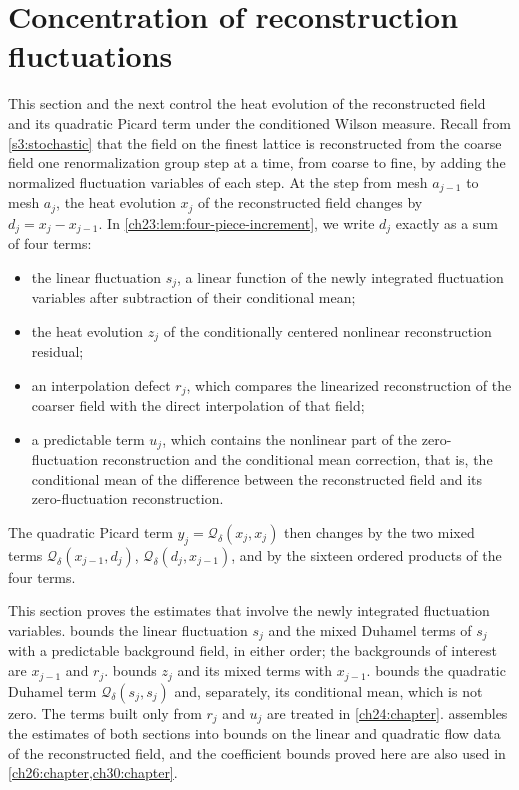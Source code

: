 \chapter{Concentration of reconstruction fluctuations}\label{ch23:chapter}

This section and the next control the heat evolution of the reconstructed field and its quadratic Picard term under the conditioned Wilson measure. Recall from \cref{s3:stochastic} that the field on the finest lattice is reconstructed from the coarse field one renormalization group step at a time, from coarse to fine, by adding the normalized fluctuation variables of each step. At the step from mesh $a_{j-1}$ to mesh $a_j$, the heat evolution $x_j$ of the reconstructed field changes by $d_j=x_j-x_{j-1}$. In \cref{ch23:lem:four-piece-increment}, we write $d_j$ exactly as a sum of four terms:
\begin{itemize}
\item the linear fluctuation $s_j$, a linear function of the newly integrated fluctuation variables after subtraction of their conditional mean;
\item the heat evolution $z_j$ of the conditionally centered nonlinear reconstruction residual;
\item an interpolation defect $r_j$, which compares the linearized reconstruction of the coarser field with the direct interpolation of that field;
\item a predictable term $u_j$, which contains the nonlinear part of the zero-fluctuation reconstruction and the conditional mean correction, that is, the conditional mean of the difference between the reconstructed field and its zero-fluctuation reconstruction.
\end{itemize}
The quadratic Picard term $y_j=\mathcal Q_\delta(x_j,x_j)$ then changes by the two mixed terms $\mathcal Q_\delta(x_{j-1},d_j)$, $\mathcal Q_\delta(d_j,x_{j-1})$, and by the sixteen ordered products of the four terms.

This section proves the estimates that involve the newly integrated fluctuation variables.  bounds the linear fluctuation $s_j$ and the mixed Duhamel terms of $s_j$ with a predictable background field, in either order; the backgrounds of interest are $x_{j-1}$ and $r_j$.  bounds $z_j$ and its mixed terms with $x_{j-1}$.  bounds the quadratic Duhamel term $\mathcal Q_\delta(s_j,s_j)$ and, separately, its conditional mean, which is not zero. The terms built only from $r_j$ and $u_j$ are treated in \cref{ch24:chapter}.  assembles the estimates of both sections into bounds on the linear and quadratic flow data of the reconstructed field, and the coefficient bounds proved here are also used in \cref{ch26:chapter,ch30:chapter}.

